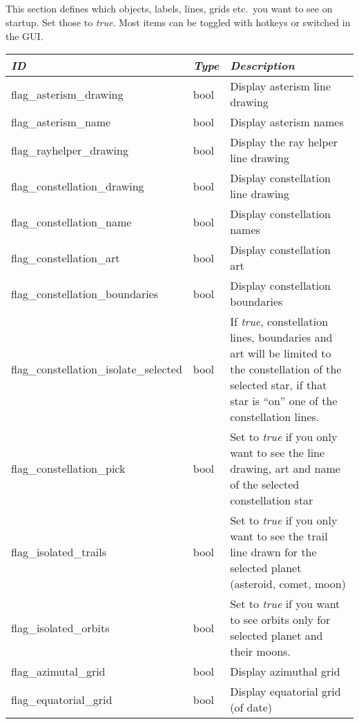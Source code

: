 \subsection{}\label{sec:config.ini:viewing}

This section defines which objects, labels, lines, grids etc.\ you
want to see on startup. Set those to \emph{true}. Most items can be
toggled with hotkeys or switched in the GUI.

\begin{longtabu} to \textwidth {l|l|X}
\toprule
\emph{ID} & \emph{Type} & \emph{Description}\\\midrule
flag\_asterism\_drawing         & bool  & Display asterism line drawing\\\midrule
flag\_asterism\_name            & bool  & Display asterism names\\\midrule
flag\_rayhelper\_drawing        & bool  & Display the ray helper line drawing\\\midrule
flag\_constellation\_drawing    & bool  & Display constellation line drawing\\\midrule
flag\_constellation\_name       & bool  & Display constellation names\\\midrule
flag\_constellation\_art        & bool  & Display constellation art\\\midrule
flag\_constellation\_boundaries & bool  & Display constellation boundaries \\\midrule
flag\_constellation\_isolate\_selected  & bool & If \emph{true}, constellation lines, boundaries and art will be limited to the constellation of the selected star, 
                                                 if that star is ``on'' one of the constellation lines.\\\midrule
flag\_constellation\_pick     & bool & Set to \emph{true} if you only want to see the line drawing, art and name of the selected constellation star\\\midrule
flag\_isolated\_trails        & bool & Set to \emph{true} if you only want to see the trail line drawn for the selected planet (asteroid, comet, moon)\\\midrule
flag\_isolated\_orbits        & bool & Set to \emph{true} if you want to see orbits only for selected planet and their moons.\\\midrule
flag\_azimutal\_grid          & bool & Display azimuthal grid \\\midrule
flag\_equatorial\_grid        & bool & Display equatorial grid (of date) \\\midrule

\end{longtabu}
